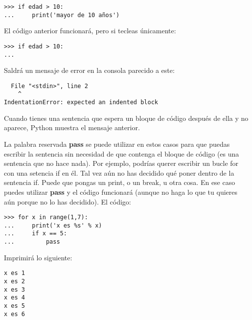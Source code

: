 \begin{listing}
\begin{listing}
\begin{verbatim}
>>> if edad > 10:
...     print('mayor de 10 años')
\end{verbatim}
\end{listing}

\noindent
El código anterior funcionará, pero si tecleas únicamente:

\begin{listingignore}
\begin{verbatim}
>>> if edad > 10:
...
\end{verbatim}
\end{listingignore}

\noindent
Saldrá un mensaje de error en la consola parecido a este:

\begin{listingignore}
\begin{verbatim}
  File "<stdin>", line 2
    ^
IndentationError: expected an indented block
\end{verbatim}
\end{listingignore}

Cuando tienes una sentencia que espera un bloque de código después de ella y no aparece, Python muestra el mensaje anterior.
\par
La palabra reservada \textbf{pass} se puede utilizar en estos casos para que puedas escribir la sentencia sin necesidad de que contenga el bloque de código (es una sentencia que no hace nada).  Por ejemplo, podrías querer escribir un bucle for con una setencia if en él. Tal vez aún no has decidido qué poner dentro de la sentencia if.  Puede que pongas un print, o un break, u otra cosa.  En ese caso puedes utilizar \textbf{pass} y el código funcionará (aunque no haga lo que tu quieres aún porque no lo has decidido).   El código:

\begin{listing}
\begin{verbatim}
>>> for x in range(1,7):
...     print('x es %s' % x)
...     if x == 5:
...         pass
\end{verbatim}
\end{listing}

\noindent
Imprimirá lo siguiente:

\begin{listing}
\begin{verbatim}
x es 1
x es 2
x es 3
x es 4
x es 5
x es 6
\end{verbatim}
\end{listing}


\end{listing}
